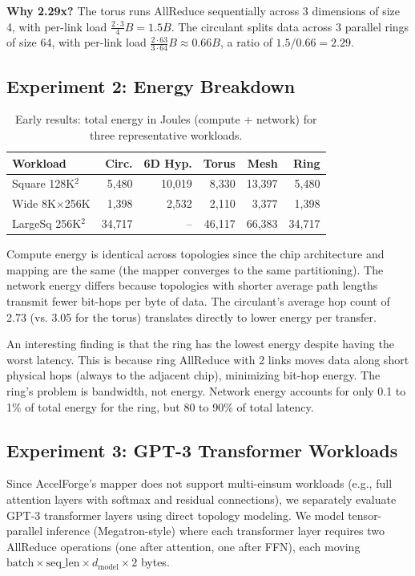\documentclass[conference,onecolumn]{IEEEtran}
\begin{document}
\textbf{Why 2.29x?} The torus runs AllReduce sequentially across 3 dimensions of size 4, with per-link load $\frac{2 \cdot 3}{4} B = 1.5B$. The circulant splits data across 3 parallel rings of size 64, with per-link load $\frac{2 \cdot 63}{3 \cdot 64} B \approx 0.66B$, a ratio of $1.5 / 0.66 = 2.29$.

\subsection{Experiment 2: Energy Breakdown}

\begin{table}[h]
\centering
\caption{Early results: total energy in Joules (compute + network) for three representative workloads.}
\label{tab:energy}
\begin{tabular}{l r r r r r}
\toprule
Workload & Circ. & 6D Hyp. & Torus & Mesh & Ring \\
\midrule
Square 128K$^2$   & 5,480 & 10,019 & 8,330 & 13,397 & 5,480 \\
Wide 8K$\times$256K     & 1,398 & 2,532 & 2,110 & 3,377 & 1,398 \\
LargeSq 256K$^2$  & 34,717 & -- & 46,117 & 66,383 & 34,717 \\
\bottomrule
\end{tabular}
\end{table}

Compute energy is identical across topologies since the chip architecture and mapping are the same (the mapper converges to the same partitioning). The network energy differs because topologies with shorter average path lengths transmit fewer bit-hops per byte of data. The circulant's average hop count of 2.73 (vs. 3.05 for the torus) translates directly to lower energy per transfer.

An interesting finding is that the ring has the lowest energy despite having the worst latency. This is because ring AllReduce with 2 links moves data along short physical hops (always to the adjacent chip), minimizing bit-hop energy. The ring's problem is bandwidth, not energy. Network energy accounts for only 0.1 to 1\% of total energy for the ring, but 80 to 90\% of total latency.

\subsection{Experiment 3: GPT-3 Transformer Workloads}

Since AccelForge's mapper does not support multi-einsum workloads (e.g., full attention layers with softmax and residual connections), we separately evaluate GPT-3 transformer layers using direct topology modeling. We model tensor-parallel inference (Megatron-style) where each transformer layer requires two AllReduce operations (one after attention, one after FFN), each moving $\text{batch} \times \text{seq\_len} \times d_\text{model} \times 2$ bytes.
\end{document}
